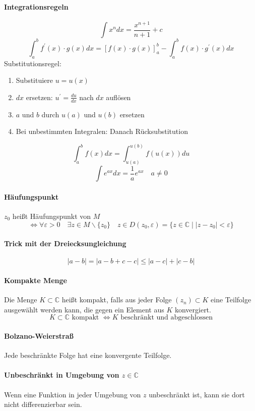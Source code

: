\documentclass[a4paper, 10pt, DIV20, headings=small]{scrartcl}
\theoremstyle{definition}
\theoremstyle{plain}
\begin{document}
\paragraph{Integrationsregeln}
$$\int x^n dx = \frac{x^{n+1}}{n+1}+c$$
$$\int_a^b f^\prime(x) \cdot g(x) dx = [f(x) \cdot g(x)]_a^b - \int_a^b f(x) \cdot g^\prime(x) dx$$
Substitutionsregel:
\begin{enumerate}
\item Substituiere $u = u(x)$
\item $dx$ ersetzen: $u^\prime = \frac{du}{dx}$ nach $dx$ auflösen
\item $a$ und $b$ durch $u(a)$ und $u(b)$ ersetzen
\item Bei unbestimmten Integralen: Danach Rücksubstitution
\end{enumerate}
$$\int_a^b f(x) dx = \int_{u(a)}^{u(b)} f(u(x)) du$$
$$\int e^{ax}dx = \frac{1}{a} e^{ax} \quad a \neq 0$$

\paragraph{Häufungspunkt}
$z_0$ heißt Häufungspunkt von $M$
$$\Leftrightarrow \forall \varepsilon > 0 \quad \exists z \in M \backslash \{z_0\} \quad z \in D(z_0, \varepsilon) = \{z \in \mathbb{C} \mid |z-z_0| < \varepsilon\}$$

\paragraph{Trick mit der Dreiecksungleichung}
$$|a-b| = |a-b+c-c| \leq |a-c| + |c-b|$$

\paragraph{Kompakte Menge}
Die Menge $K \subset \mathbb{C}$ heißt kompakt, falls aus jeder Folge $(z_n) \subset K$ eine Teilfolge
ausgewählt werden kann, die gegen ein Element aus $K$ konvergiert.
$$K \subset \mathbb{C} \text{ kompakt } \Leftrightarrow K \text{ beschränkt und abgeschlossen}$$

\paragraph{Bolzano-Weierstraß}
Jede beschränkte Folge hat eine konvergente Teilfolge.

\paragraph{Unbeschränkt in Umgebung von $z \in \mathbb{C}$}
Wenn eine Funktion in jeder Umgebung von $z$ unbeschränkt ist, kann sie dort nicht differenzierbar sein.
\end{document}
